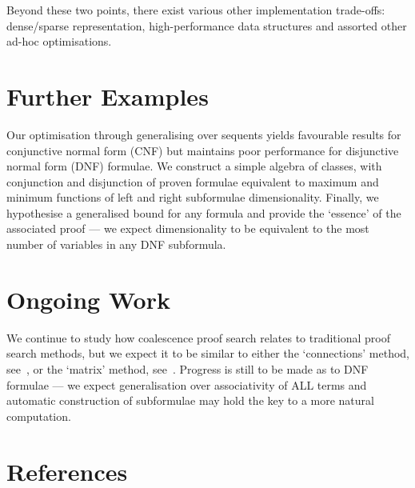         Beyond these two points, there exist various other implementation trade-offs: dense/sparse representation, high-performance data structures and assorted other ad-hoc optimisations.

    \section*{Further Examples}
        Our optimisation through generalising over sequents yields favourable results for conjunctive normal form (CNF) but maintains poor performance for disjunctive normal form (DNF) formulae.
        We construct a simple algebra of classes, with conjunction and disjunction of proven formulae equivalent to maximum and minimum functions of left and right subformulae dimensionality.
        Finally, we hypothesise a generalised bound for any formula and provide the `essence' of the associated proof --- we expect dimensionality to be equivalent to the most number of variables in any DNF subformula.

    \section*{Ongoing Work}
        We continue to study how coalescence proof search relates to traditional proof search methods, but we expect it to be similar to either the `connections' method, see~\cite{connection-based-proof-method}, or the `matrix' method, see~\cite{tableaux-for-logic-of-proofs}.
        Progress is still to be made as to DNF formulae --- we expect generalisation over associativity of ALL terms and automatic construction of subformulae may hold the key to a more natural computation.

    \section*{References}
        


